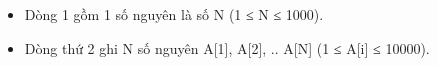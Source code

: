 \begin{itemize}
	\item     Dòng 1 gồm 1 số nguyên là số N (1 ≤ N ≤ 1000).   
	\item     Dòng thứ 2 ghi N số nguyên A[1], A[2], .. A[N] (1 ≤ A[i] ≤ 10000).   
\end{itemize}

\